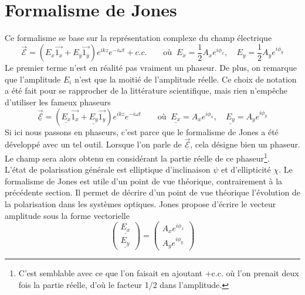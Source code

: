 	
\newpage
\section{Formalisme de Jones}
Ce formalisme se base sur la représentation complexe du champ électrique
\begin{equation}
\vec{\mathcal{E}} = (E_x\vec{1_x}+E_y\vec{1_y})e^{ikz}e^{-i\omega t} + c.c.\qquad\text{où }\ E_x = 
\frac{1}{2}A_xe^{i\phi_x},\quad E_y = \frac{1}{2}A_ye^{i\phi_y}
\end{equation}
Le premier terme n'est en réalité pas vraiment un phaseur. De plus, on remarque que l'amplitude 
$E_i$ n'est que la moitié de l'amplitude réelle. Ce choix de notation a été fait pour se rapprocher 
de la littérature scientifique, mais rien n'empêche d'utiliser les fameux phaseurs
\begin{equation}
\underline{\vec{\mathcal{E}}} = (\underline{E_x}\vec{1_x}+\underline{E_y}\vec{1_y})e^{ikz}e^{-i\omega t}\qquad\text{où }\ \underline{E_x} = A_xe^{i\phi_x},\quad \underline{E_y} = A_ye^{i\phi_y}
\end{equation}
Si ici nous passons en phaseurs, c'est parce que le formalisme de Jones a été développé avec un 
tel outil. Lorsque l'on parle de $\underline{\vec{\mathcal{E}}}$, cela désigne bien un phaseur. Le 
champ sera alors obtenu en considérant la partie réelle de ce phaseur\footnote{C'est semblable avec 
ce que l'on faisait en ajoutant +c.c. où l'on prenait deux fois la partie réelle, d'où le facteur 
1/2 dans l'amplitude.}.\\

L'état de polarisation générale est elliptique d'inclinaison $\psi$ et d'ellipticité $\chi$. Le 
formalisme de Jones est utile d'un point de vue théorique, contrairement à la précédente section. 
Il permet de décrire d'un point de vue théorique l'évolution de la polarisation dans les systèmes 
optiques. Jones propose d'écrire le vecteur amplitude sous la forme vectorielle 
\begin{equation}
\left(\begin{array}{c}
\underline{E_x}\\
\underline{E_y}
\end{array}\right) = \left(\begin{array}{c}
A_xe^{i\phi_x}\\
A_ye^{i\phi_y}
\end{array}\right)
\end{equation}

